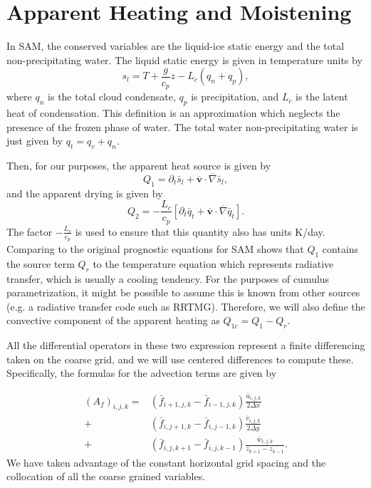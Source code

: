 \documentclass{report}
\newcommand{\1}[1]{\mathds{1}\left[#1\right]}
\begin{document}
\section{Apparent Heating and Moistening}
\label{sec:q1q2}

In SAM, the conserved variables are the liquid-ice static energy and the total non-precipitating water. The liquid static energy is given in temperature units by 
\[ s_l = T + \frac{g}{c_p} z - L_c(q_n + q_p),\]
where $q_n$ is the total cloud condensate, $q_p$ is precipitation, and $L_c$ is the latent heat of condensation. This definition is an approximation which neglects the presence of the frozen phase of water. The total water non-precipitating water is just given by 
$q_t = q_v + q_n.$

Then, for our purposes, the apparent heat source is given by
\[Q_1 = \partial_t {\bar{s}_l} + \overline{ \mathbf{v} }\cdot \overline{\nabla} \bar{s}_l, \]
and the apparent drying is given by
\[Q_2 = - \frac{L_c}{c_p} \left[\partial_t {\bar{q}_t} +\overline{ \mathbf{v} } \cdot \overline{\nabla} \bar{q}_t\right].\]
The factor $-\frac{L_c}{c_p}$ is used to ensure that this quantity also has units K/day. Comparing to the original prognostic equations for SAM shows that $Q_1$ contains the source term  $Q_r$ to the temperature equation which represents radiative transfer, which is usually a cooling tendency. For the purposes of cumulus parametrization, it might be possible to assume this is known from other sources (e.g. a radiative transfer code such as RRTMG). Therefore, we will also define the convective component of the apparent heating as $Q_{1c} = Q_1 - Q_r$. 

All the differential operators in these two expression represent a finite
differencing taken on the coarse grid, and we will use centered differences to
compute these. Specifically, the formulas for the advection terms are given
by
\renewcommand{\bf}{\bar{f}_{i,j}}


\begin{align}
  (A_f)_{i,j,k} = &\left( \bar{f}_{i+1,j,k} - \bar{f}_{i-1,j,k} \right) \frac{\bar{u}_{i,j,k}}{2 \Delta x}\\
              +&\left( \bar{f}_{i,j+1,k} - \bar{f}_{i,j-1,k} \right) \frac{\bar{v}_{i,j,k}}{2 \Delta y}\nonumber\\
              +& \left(  \bar{f}_{i,j,k+1} - \bar{f}_{i,j,k-1} \right) \frac{\bar{w}_{i,j,k}}{z_{k+1} - z_{k-1}}.\nonumber
\end{align}
We have taken advantage of the constant horizontal grid spacing and the
collocation of all the coarse grained variables.
\end{document}
